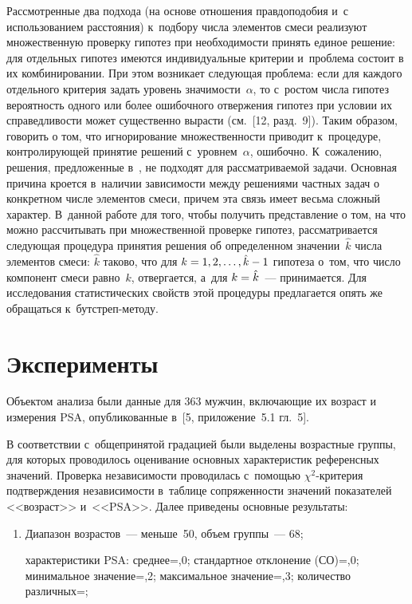 \begin{multicols}{2}
     Рассмотренные два подхода (на основе отношения правдоподобия и~с
использованием рас\-стояния) к~подбору числа элементов смеси реализуют
множественную проверку гипотез при необходи\-мости принять единое решение:
для отдельных гипотез имеются индивидуальные критерии и~проблема состоит
в их комбинировании. При этом возникает следующая проб\-ле\-ма: если для
каж\-до\-го отдельного критерия задать уровень значимости~$\alpha$, то с~ростом
чис\-ла гипотез вероятность одного или более ошибочного отвержения гипотез
при условии их справедливости может существенно вы\-рас\-ти (см.~[12,
разд.~9]). Таким образом, говорить о том, что игнорирование
множественности приводит к~процедуре, контролирующей принятие решений
с~уровнем~$\alpha$, ошибочно. К~сожалению, решения, предложенные
в~\cite{12-kri}, не подходят для рассматриваемой задачи. Основная причина
кроется в~наличии зависимости между решениями частных задач о конкретном
числе элементов смеси, причем эта связь имеет весьма сложный характер.
В~данной работе для того, чтобы получить представление о том, на что можно
рассчитывать при множественной проверке гипотез, рассматривается
следующая процедура принятия решения об определенном значении~$\hat{k}$
числа элементов смеси: $\hat{k}$ таково, что для $k\hm= 1,2,\ldots, \hat{k}\hm-
1$ гипотеза о~том, что число компонент смеси равно~$k$, отвергается, а~для
$k\hm= \hat{k}$~--- принимается. Для исследования статистических свойств этой
процедуры предлагается опять же обращаться к~бут\-стреп-ме\-тоду.

\section{Эксперименты}

     Объектом анализа были данные для 363 мужчин, включающие их возраст
и измерения PSA, опубликованные в~[5, приложение~5.1
гл.~5].

     В соответствии с~общепринятой градацией были выделены возрастные
группы, для которых проводилось оценивание основных характеристик
референсных значений. Проверка независимости проводилась с~помощью
     $\chi^2$-кри\-те\-рия подтверждения независимости в~таблице
сопряженности значений показателей <<возраст>> и~<<PSA>>. Далее
приведены основные результаты:
     \begin{enumerate}[1.]
\item Диапазон возрастов~--- меньше~50, объем группы~--- 68;

характеристики PSA: сред\-нее\;=,0; стандартное отклонение (СО)\;=,0;
минимальное зна\-че\-ние\;=,2;
максимальное зна\-че\-ние\;=,3; количество раз\-лич\-ных\;=;


\end{enumerate}
\end{multicols}
